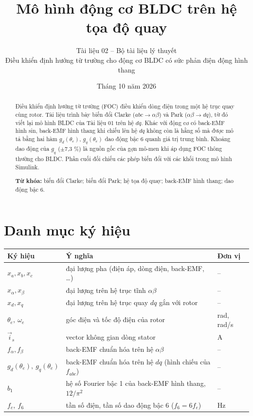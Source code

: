 \documentclass[11pt,a4paper]{article}
\title{\vspace{-1.2cm}\textbf{Mô hình động cơ BLDC trên hệ tọa độ quay}}
\author{\normalsize Tài liệu 02 -- Bộ tài liệu lý thuyết\\[2pt]
\small Điều khiển định hướng từ trường cho động cơ BLDC có sức phản điện động hình thang}
\date{\small Tháng 10 năm 2026}
\begin{document}
\maketitle

\begin{abstract}
\noindent Điều khiển định hướng từ trường (FOC) điều khiển dòng điện trong một hệ trục quay cùng rotor. Tài liệu trình bày biến đổi Clarke ($abc\to\alpha\beta$) và Park ($\alpha\beta\to dq$), từ đó viết lại mô hình BLDC của Tài liệu 01 trên hệ $dq$. Khác với động cơ có back-EMF hình sin, back-EMF hình thang khi chiếu lên hệ $dq$ không còn là hằng số mà được mô tả bằng hai hàm $g_d(\theta_e)$, $g_q(\theta_e)$ dao động bậc 6 quanh giá trị trung bình. Khoảng dao động của $g_q$ ($\pm$7,3 \%) là nguồn gốc của gợn mô-men khi áp dụng FOC thông thường cho BLDC. Phần cuối đối chiếu các phép biến đổi với các khối trong mô hình Simulink.

\vspace{0.5em}
\noindent\textbf{Từ khóa:} biến đổi Clarke; biến đổi Park; hệ tọa độ quay; back-EMF hình thang; dao động bậc 6.
\end{abstract}


\tableofcontents
\newpage

\section*{Danh mục ký hiệu}

\begin{center}\small
\begin{tabular}{@{}lll@{}}
\toprule
Ký hiệu & Ý nghĩa & Đơn vị \\ \midrule
$x_a, x_b, x_c$ & đại lượng pha (điện áp, dòng điện, back-EMF, \ldots{}) & – \\
$x_\alpha, x_\beta$ & đại lượng trên hệ trục tĩnh $\alpha\beta$ & – \\
$x_d, x_q$ & đại lượng trên hệ trục quay $dq$ gắn với rotor & – \\
$\theta_e,\ \omega_e$ & góc điện và tốc độ điện của rotor & rad, rad/s \\
$\vec i_s$ & vector không gian dòng stator & A \\
$f_\alpha, f_\beta$ & back-EMF chuẩn hóa trên hệ $\alpha\beta$ & – \\
$g_d(\theta_e),\ g_q(\theta_e)$ & back-EMF chuẩn hóa trên hệ $dq$ (hình chiếu của $f_{abc}$) & – \\
$b_1$ & hệ số Fourier bậc 1 của back-EMF hình thang, $12/\pi^2$ & – \\
$f_e,\ f_6$ & tần số điện, tần số dao động bậc 6 ($f_6 = 6 f_e$) & Hz \\
\bottomrule
\end{tabular}
\end{center}
\end{document}
